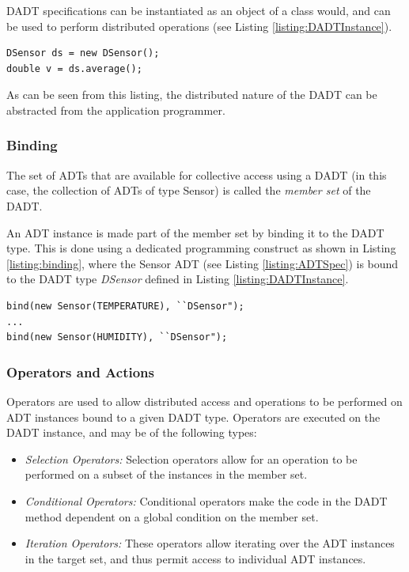DADT specifications can be instantiated as an object of a class would, and can
be used to perform distributed operations (see Listing \ref{listing:DADTInstance}).

\begin{lstlisting}[frame=trbl, basewidth={0.55em, 0.6em}, captionpos=b, 
basicstyle=\ttfamily\footnotesize, breaklines, caption = DADT Instantiation 
(reproduced from \cite{migliavacca_DADT:2006}), label = listing:DADTInstance ]
DSensor ds = new DSensor();
double v = ds.average();
\end{lstlisting}

As can be seen from this listing, the distributed nature of the DADT can be
abstracted from the application programmer.

\subsubsection{Binding}

The set of ADTs that are available for collective access using a DADT (in this
case, the collection of ADTs of type Sensor) is called the \emph{member set} of
the DADT.

An ADT instance is made part of the member set by binding it to the DADT type. This is done using a dedicated
programming construct as shown in Listing \ref{listing:binding}, where the
Sensor ADT (see Listing \ref{listing:ADTSpec}) is bound to the DADT type \emph{DSensor}
defined in Listing \ref{listing:DADTInstance}. 
 
 
\begin{lstlisting}[frame=trbl, basewidth={0.55em, 0.6em}, captionpos=b, 
basicstyle=\ttfamily\footnotesize, breaklines, caption = Binding ADT instances to a DADT instance, label = listing:binding ]
bind(new Sensor(TEMPERATURE), ``DSensor");
...
bind(new Sensor(HUMIDITY), ``DSensor");
\end{lstlisting} 
 

\subsubsection{Operators and Actions} \label{subsubsec:OperatorsAndActions}

Operators are used to allow distributed access and operations to be performed on
ADT instances bound to a given DADT type. Operators are executed on the DADT
instance, and may be of the following types:

\begin{itemize}
  \item \emph{Selection Operators:} Selection operators allow for an operation
  to be performed on a subset of the instances in the member set.
  \item \emph{Conditional Operators:} Conditional operators make the code in the
  DADT method dependent on a global condition on the member set. 
  \item \emph{Iteration Operators:} These operators allow iterating over the ADT
  instances in the target set, and thus permit access to individual ADT instances.
\end{itemize}

